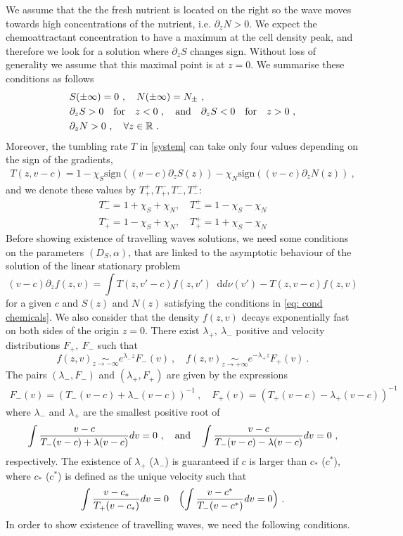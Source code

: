 \documentclass[11pt,twoside]{article}
\newcommand*\diff{\mathop{}\!\mathrm{d}}
\begin{document}
We assume that the the fresh nutrient is located on the right so the wave moves towards high concentrations of the nutrient, i.e.  $\partial_zN>0$. We expect the chemoattractant concentration to have a maximum at the cell density peak, and therefore we look for a solution where  $\partial_zS$ changes sign. Without loss of generality we assume that this maximal point is at $z=0$.  We summarise these conditions as follows
\begin{equation}
\begin{aligned}
 &S(\pm \infty)=0\ ,\quad N(\pm\infty)=N_\pm\ ,\\
&\partial_z S>0  \quad  \textrm{for}\quad z<0\ , \quad\textnormal{and}\quad\partial_z S<0 \quad \textrm{for}\quad z>0\ ,\\
&\partial_zN>0\ ,\quad\forall z\in\mathbb{R}\ .\label{eq: cond chemicals}
\end{aligned}
\end{equation}
Moreover, the tumbling rate $T$ in \eqref{system} can take only four values depending on the sign of the gradients,
\begin{eqnarray}\label{tumbl}
   T(z,v-c)=1-\chi_S \textrm{sign}((v-c)\partial_z S(z))-\chi_N \textrm{sign}((v-c)\partial_z N(z))\ ,
\end{eqnarray}
and we denote these values by $T^+_+,T^-_+, T^-_-, T^+_- $:
\begin{align*}
T^-_-=1+\chi_S+\chi_N,\quad T^+_-=1-\chi_S-\chi_N\\
T^-_+=1-\chi_S+\chi_N,\quad T^+_+=1+\chi_S-\chi_N
\end{align*}
Before showing existence of travelling waves solutions, we need some conditions on the parameters $(D_S,\alpha)$,
that are linked to the asymptotic behaviour of the solution of the linear stationary problem
\[
(v-c)\partial_zf(z,v)=\int T(z,v'-c)f(z,v')\diff d\nu(v')-T(z,v-c)f(z,v)
\]
for a given $c$ and $S(z)$ and $N(z)$ satisfying the conditions in \eqref{eq: cond chemicals}. We also consider that the density $f(z,v)$ decays exponentially fast on both sides of the origin $z=0$. There exist $\lambda_+,\ \lambda_-$ positive and velocity distributions $F_+,\ F_-$ such that
\[
f(z,v)\underset{z\to-\infty}{\sim} e^{\lambda_-z}F_-(v)\ , \quad f(z,v)\underset{z\to+\infty}{\sim} e^{-\lambda_+z}F_+(v)\ .
\]
The pairs $(\lambda_-,F_-)$ and $(\lambda_+,F_+)$ are given by the expressions
\begin{align}
    F_-(v)=(T_-(v-c)+\lambda_-(v-c))^{-1}\ ,\quad F_+(v)=(T_+(v-c)-\lambda_+(v-c))^{-1}
\end{align}
where $\lambda_-$ and $\lambda_+$ are the smallest positive root of
\[
\int\frac{v-c}{T_-(v-c)+\lambda(v-c)}dv=0\ ,\quad\textnormal{and}\quad \int\frac{v-c}{T_-(v-c)-\lambda(v-c)}dv=0\ ,
\]
respectively.
The existence of $\lambda_{+}$ ($\lambda_-$) is guaranteed if $c$ is larger than $c_*$ ($c^*$), where $c_*$ ($c^*$) is defined as the unique velocity such that
\[
\int \frac{v-c_*}{T_+(v-c_*)}dv=0\quad \Bigl(\int \frac{v-c^*}{T_-(v-c^*)}dv=0 \Bigr)\ .
\]
In order to show existence of travelling waves, we need the following conditions.
\end{document}
